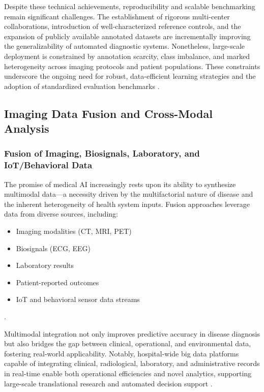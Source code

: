 Despite these technical achievements, reproducibility and scalable benchmarking remain significant challenges. The establishment of rigorous multi-center collaborations, introduction of well-characterized reference controls, and the expansion of publicly available annotated datasets are incrementally improving the generalizability of automated diagnostic systems. Nonetheless, large-scale deployment is constrained by annotation scarcity, class imbalance, and marked heterogeneity across imaging protocols and patient populations. These constraints underscore the ongoing need for robust, data-efficient learning strategies and the adoption of standardized evaluation benchmarks \cite{ref94}.

\subsection{Imaging Data Fusion and Cross-Modal Analysis}

\subsubsection{Fusion of Imaging, Biosignals, Laboratory, and IoT/Behavioral Data}

The promise of medical AI increasingly rests upon its ability to synthesize multimodal data—a necessity driven by the multifactorial nature of disease and the inherent heterogeneity of health system inputs. Fusion approaches leverage data from diverse sources, including:
\begin{itemize}
    \item Imaging modalities (CT, MRI, PET)
    \item Biosignals (ECG, EEG)
    \item Laboratory results
    \item Patient-reported outcomes
    \item IoT and behavioral sensor data streams
\end{itemize}
\cite{ref46,ref53,ref67,ref71}. 

Multimodal integration not only improves predictive accuracy in disease diagnosis but also bridges the gap between clinical, operational, and environmental data, fostering real-world applicability. Notably, hospital-wide big data platforms capable of integrating clinical, radiological, laboratory, and administrative records in real-time enable both operational efficiencies and novel analytics, supporting large-scale translational research and automated decision support \cite{ref106}.

